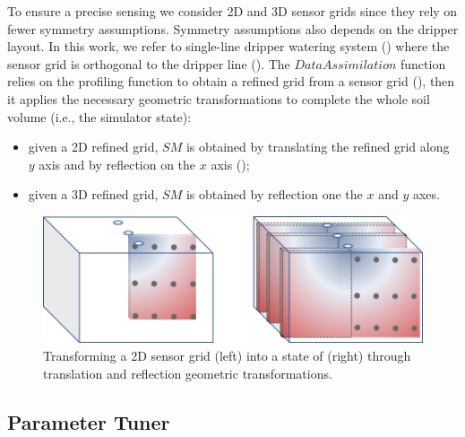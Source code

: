 To ensure a precise sensing we consider 2D and 3D sensor grids since they rely on fewer symmetry assumptions.
Symmetry assumptions also depends on the dripper layout.
In this work, we refer to single-line dripper watering system ()
where the sensor grid is orthogonal to the dripper line (). 
The $DataAssimilation$ function relies on the profiling function to obtain a refined grid from a sensor grid (), then it applies the necessary geometric transformations to complete the whole soil volume (i.e., the simulator state):
\begin{itemize}
    \item given a 2D refined grid, $SM$ is obtained by translating the refined grid along $y$ axis and by reflection on the $x$ axis ();
    \item given a 3D refined grid, $SM$ is obtained by reflection one the $x$ and $y$ axes.
\end{itemize}

 \begin{figure}[t]
	\centering
	\includegraphics[scale=0.7]{chapters/physics-aware/orchard/img/Simmetries.png}
	\caption{Transforming a 2D sensor grid (left) into a state of \olab{} (right) through translation and reflection geometric transformations.}
	\label{orchard-fig:simmetries}
\end{figure}


\subsection{Parameter Tuner}

